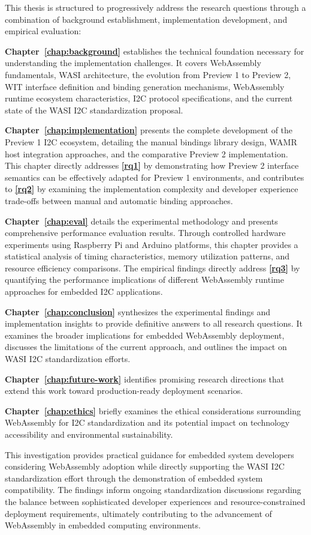 This thesis is structured to progressively address the research questions through a combination of background establishment, implementation development, and empirical evaluation:

\textbf{Chapter~\ref{chap:background}} establishes the technical foundation necessary for understanding the implementation challenges. It covers WebAssembly fundamentals, WASI architecture, the evolution from Preview 1 to Preview 2, WIT interface definition and binding generation mechanisms, WebAssembly runtime ecosystem characteristics, I2C protocol specifications, and the current state of the WASI I2C standardization proposal.

\textbf{Chapter~\ref{chap:implementation}} presents the complete development of the Preview 1 I2C ecosystem, detailing the manual bindings library design, WAMR host integration approaches, and the comparative Preview 2 implementation. This chapter directly addresses \textbf{\autoref{rq1}} by demonstrating how Preview 2 interface semantics can be effectively adapted for Preview 1 environments, and contributes to \textbf{\autoref{rq2}} by examining the implementation complexity and developer experience trade-offs between manual and automatic binding approaches.

\textbf{Chapter~\ref{chap:eval}} details the experimental methodology and presents comprehensive performance evaluation results. Through controlled hardware experiments using Raspberry Pi and Arduino platforms, this chapter provides a statistical analysis of timing characteristics, memory utilization patterns, and resource efficiency comparisons. The empirical findings directly address \textbf{\autoref{rq3}} by quantifying the performance implications of different WebAssembly runtime approaches for embedded I2C applications.

\textbf{Chapter~\ref{chap:conclusion}} synthesizes the experimental findings and implementation insights to provide definitive answers to all research questions. It examines the broader implications for embedded WebAssembly deployment, discusses the limitations of the current approach, and outlines the impact on WASI I2C standardization efforts.

\textbf{Chapter~\ref{chap:future-work}} identifies promising research directions that extend this work toward production-ready deployment scenarios.

\textbf{Chapter~\ref{chap:ethics}} briefly examines the ethical considerations surrounding WebAssembly for I2C standardization and its potential impact on technology accessibility and environmental sustainability.

This investigation provides practical guidance for embedded system developers considering WebAssembly adoption while directly supporting the WASI I2C standardization effort through the demonstration of embedded system compatibility. The findings inform ongoing standardization discussions regarding the balance between sophisticated developer experiences and resource-constrained deployment requirements, ultimately contributing to the advancement of WebAssembly in embedded computing environments.